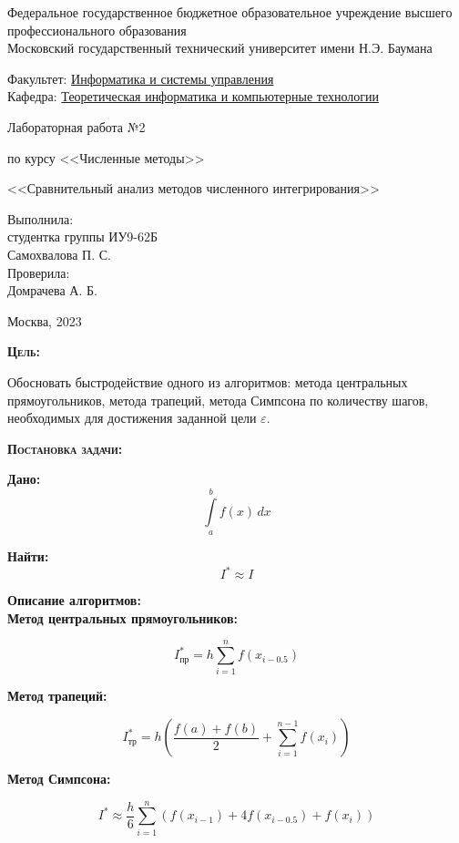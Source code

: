 \documentclass [12pt]{article}
\title{}
\date{}
\author{}
\begin{document}
\begin{titlepage}
\thispagestyle{empty}
\begin{center}
Федеральное государственное бюджетное образовательное учреждение высшего профессионального образования \\Московский государственный технический университет имени Н.Э. Баумана

\end{center}
\bigskip
\begin{flushleft}
Факультет: \underline{Информатика и системы управления}\\
Кафедра: \underline{Теоретическая информатика и компьютерные технологии}
\end{flushleft}
\vfill
\centerline{\large{Лабораторная работа №2}}
\centerline{\large{по курсу <<Численные методы>>}}
\centerline{\large{<<Сравнительный анализ методов численного интегрирования>>}}
\vfill
\hfill\parbox{5cm} {
           Выполнила:\\
           студентка группы ИУ9-62Б \hfill \\
           Самохвалова П. С.\hfill \medskip\\
           Проверила:\\
           Домрачева А. Б.\hfill
       }
\centerline{Москва, 2023}
\clearpage
\end{titlepage}

\textsc{\textbf{Цель:}}

Обосновать быстродействие одного из алгоритмов: метода центральных прямоугольников, метода трапеций, метода Симпсона по количеству шагов, необходимых для достижения заданной цели $\varepsilon$.

\textsc{\textbf{Постановка задачи:}}

\textbf{Дано:}  $$\int\limits_a^b f(x)\,dx $$

\textbf{Найти:} $$I^{*} \approx  I $$

\textbf{Описание алгоритмов:}\\

\textbf{Метод центральных прямоугольников:}

$$I_{пр}^{*} = h\sum\limits_{i=1}^n f(x_{i - 0.5})$$

\textbf{Метод трапеций:}

$$I_{тр}^{*} = h(\frac{f(a)+f(b)}{2}+\sum\limits_{i=1}^{n-1} f(x_i))$$

\textbf{Метод Симпсона:}

$$I^{*} \approx \frac{h}{6}\sum\limits_{i=1}^n (f(x_{i-1}) + 4f(x_{i-0.5}) + f(x_{i}))$$\\
\end{document}
